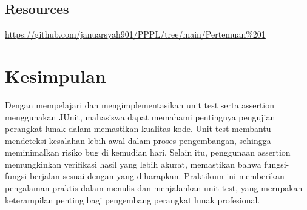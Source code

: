 \documentclass[a4paper,oneside,11pt]{book}
\begin{document}
\section*{Resources}
\url{https://github.com/januarsyah901/PPPL/tree/main/Pertemuan%201}
\chapter{Kesimpulan}
Dengan mempelajari dan mengimplementasikan unit test serta assertion menggunakan JUnit, mahasiswa dapat memahami pentingnya pengujian perangkat lunak dalam memastikan kualitas kode. Unit test membantu mendeteksi kesalahan lebih awal dalam proses pengembangan, sehingga meminimalkan risiko bug di kemudian hari. Selain itu, penggunaan assertion memungkinkan verifikasi hasil yang lebih akurat, memastikan bahwa fungsi-fungsi berjalan sesuai dengan yang diharapkan. Praktikum ini memberikan pengalaman praktis dalam menulis dan menjalankan unit test, yang merupakan keterampilan penting bagi pengembang perangkat lunak profesional.
\end{document}
